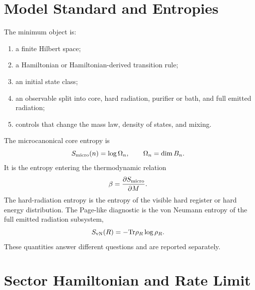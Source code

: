 \documentclass[aps,prd,onecolumn,longbibliography,nofootinbib]{revtex4-2}
\newcommand{\Tr}{\mathrm{Tr}}
\newcommand{\Smicro}{S_{\rm micro}}
\newcommand{\Svn}{S_{\rm vN}}
\begin{document}
\section{Model Standard and Entropies}
\label{sec:standard}

The minimum object is:
\begin{enumerate}[leftmargin=*]
    \item a finite Hilbert space;
    \item a Hamiltonian or Hamiltonian-derived transition rule;
    \item an initial state class;
    \item an observable split into core, hard radiation, purifier or bath, and
    full emitted radiation;
    \item controls that change the mass law, density of states, and mixing.
\end{enumerate}

The microcanonical core entropy is
\begin{equation}
    \Smicro(n)=\log\Omega_n,\qquad \Omega_n=\dim B_n .
\end{equation}
It is the entropy entering the thermodynamic relation
\begin{equation}
    \beta=\frac{\partial \Smicro}{\partial M}.
\end{equation}
The hard-radiation entropy is the entropy of the visible hard register or hard
energy distribution.  The Page-like diagnostic is the von Neumann entropy of
the full emitted radiation subsystem,
\begin{equation}
    \Svn(R)=-\Tr \rho_R\log\rho_R .
\end{equation}
These quantities answer different questions and are reported separately.

\section{Sector Hamiltonian and Rate Limit}
\label{sec:sector}
\end{document}
